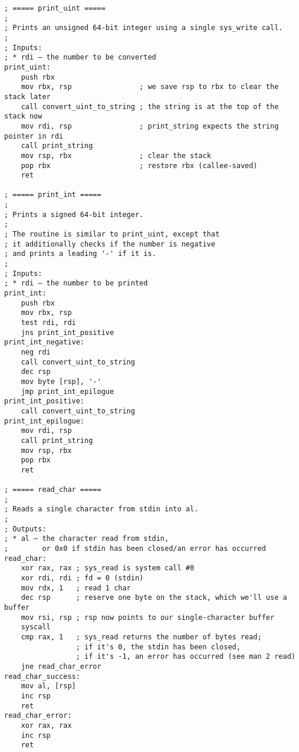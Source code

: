 \documentclass[12pt,a4paper]{report}
\begin{document}
\begin{lstlisting}[basicstyle=\scriptsize]
; ===== print_uint =====
;
; Prints an unsigned 64-bit integer using a single sys_write call.
;
; Inputs:
; * rdi — the number to be converted
print_uint:
    push rbx
    mov rbx, rsp                ; we save rsp to rbx to clear the stack later
    call convert_uint_to_string ; the string is at the top of the stack now
    mov rdi, rsp                ; print_string expects the string pointer in rdi
    call print_string
    mov rsp, rbx                ; clear the stack
    pop rbx                     ; restore rbx (callee-saved)
    ret

; ===== print_int =====
;
; Prints a signed 64-bit integer.
;
; The routine is similar to print_uint, except that
; it additionally checks if the number is negative
; and prints a leading '-' if it is.
;
; Inputs:
; * rdi — the number to be printed
print_int:
    push rbx
    mov rbx, rsp
    test rdi, rdi
    jns print_int_positive
print_int_negative:
    neg rdi
    call convert_uint_to_string
    dec rsp
    mov byte [rsp], '-'
    jmp print_int_epilogue
print_int_positive:
    call convert_uint_to_string
print_int_epilogue:
    mov rdi, rsp
    call print_string
    mov rsp, rbx
    pop rbx
    ret

; ===== read_char =====
;
; Reads a single character from stdin into al.
;
; Outputs:
; * al — the character read from stdin,
;        or 0x0 if stdin has been closed/an error has occurred
read_char:
    xor rax, rax ; sys_read is system call #0
    xor rdi, rdi ; fd = 0 (stdin)
    mov rdx, 1   ; read 1 char
    dec rsp      ; reserve one byte on the stack, which we'll use a buffer 
    mov rsi, rsp ; rsp now points to our single-character buffer
    syscall
    cmp rax, 1   ; sys_read returns the number of bytes read;
                 ; if it's 0, the stdin has been closed,
                 ; if it's -1, an error has occurred (see man 2 read)
    jne read_char_error
read_char_success:
    mov al, [rsp]
    inc rsp
    ret
read_char_error:
    xor rax, rax
    inc rsp
    ret


\end{lstlisting}
\end{document}
